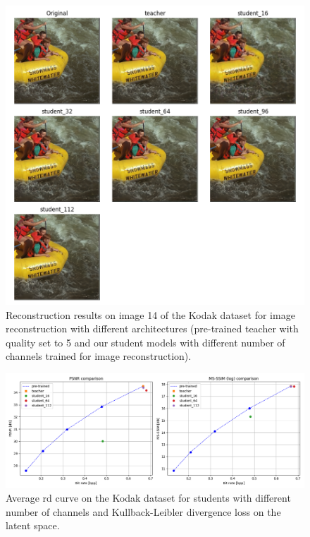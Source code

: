 \begin{figure}
    \centering
    \includegraphics[width=15cm]{../img/kd_ae_kodak_14.png}
    \caption[Reconstruction results on image 14 of the Kodak dataset for image reconstruction with different architectures.]{Reconstruction results on image 14 of the Kodak dataset for image reconstruction with different architectures (pre-trained teacher with \textsf{quality} set to 5 and our student models with different number of channels trained for image reconstruction).}
    \label{appendix:kd_ae_1:a}
\end{figure}

\begin{figure}
    \centering
    \includegraphics[width=15cm]{../img/kd_lic_rd_channels_kld.png}
    \caption[Average \acrshort{rd} curve on the Kodak dataset for students with different number of channels and Kullback-Leibler divergence loss on the latent space.]{Average \acrshort{rd} curve on the Kodak dataset for students with different number of channels and Kullback-Leibler divergence loss on the latent space.}
    \label{appendix:kd_lic_1_kld}
\end{figure}

